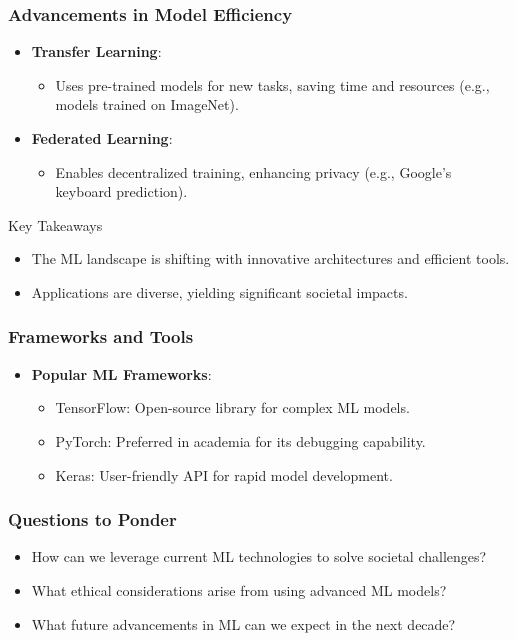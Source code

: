 \documentclass[aspectratio=169]{beamer}
\begin{document}
\begin{frame}[fragile]
    \frametitle{Advancements in Model Efficiency}
    \begin{itemize}
        \item \textbf{Transfer Learning}: 
        \begin{itemize}
            \item Uses pre-trained models for new tasks, saving time and resources (e.g., models trained on ImageNet).
        \end{itemize}
        \item \textbf{Federated Learning}: 
        \begin{itemize}
            \item Enables decentralized training, enhancing privacy (e.g., Google's keyboard prediction).
        \end{itemize}
    \end{itemize}

    \begin{block}{Key Takeaways}
        \begin{itemize}
            \item The ML landscape is shifting with innovative architectures and efficient tools.
            \item Applications are diverse, yielding significant societal impacts.
        \end{itemize}
    \end{block}
\end{frame}

\begin{frame}[fragile]
    \frametitle{Frameworks and Tools}
    \begin{itemize}
        \item \textbf{Popular ML Frameworks}:
        \begin{itemize}
            \item TensorFlow: Open-source library for complex ML models.
            \item PyTorch: Preferred in academia for its debugging capability.
            \item Keras: User-friendly API for rapid model development.
        \end{itemize}
    \end{itemize}
\end{frame}

\begin{frame}[fragile]
    \frametitle{Questions to Ponder}
    \begin{itemize}
        \item How can we leverage current ML technologies to solve societal challenges?
        \item What ethical considerations arise from using advanced ML models?
        \item What future advancements in ML can we expect in the next decade?
    \end{itemize}
\end{frame}
\end{document}
